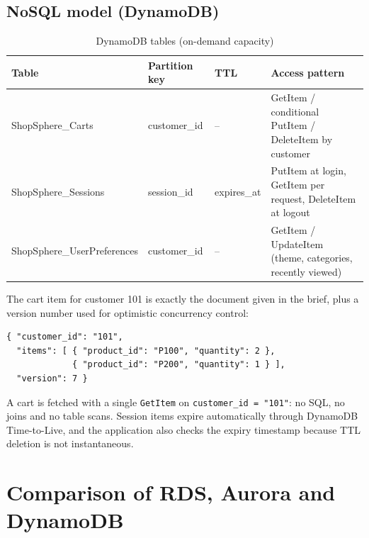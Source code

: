\documentclass[11pt,a4paper]{article}
\begin{document}
\subsection{NoSQL model (DynamoDB)}
\begin{table}[H]
\centering\small
\begin{tabularx}{\linewidth}{@{}l l l X@{}}
\toprule
\textbf{Table} & \textbf{Partition key} & \textbf{TTL} & \textbf{Access pattern}\\
\midrule
ShopSphere\_Carts & customer\_id & -- & GetItem / conditional PutItem / DeleteItem by customer\\
ShopSphere\_Sessions & session\_id & expires\_at & PutItem at login, GetItem per request, DeleteItem at logout\\
ShopSphere\_UserPreferences & customer\_id & -- & GetItem / UpdateItem (theme, categories, recently viewed)\\
\bottomrule
\end{tabularx}
\caption{DynamoDB tables (on-demand capacity)}
\end{table}

The cart item for customer 101 is exactly the document given in the brief, plus a version number used for optimistic concurrency control:
\begin{lstlisting}
{ "customer_id": "101",
  "items": [ { "product_id": "P100", "quantity": 2 },
             { "product_id": "P200", "quantity": 1 } ],
  "version": 7 }
\end{lstlisting}
A cart is fetched with a single \texttt{GetItem} on \texttt{customer\_id = "101"}: no SQL, no joins and no table scans. Session items expire automatically through DynamoDB Time-to-Live, and the application also checks the expiry timestamp because TTL deletion is not instantaneous.

\section{Comparison of RDS, Aurora and DynamoDB}
\end{document}
